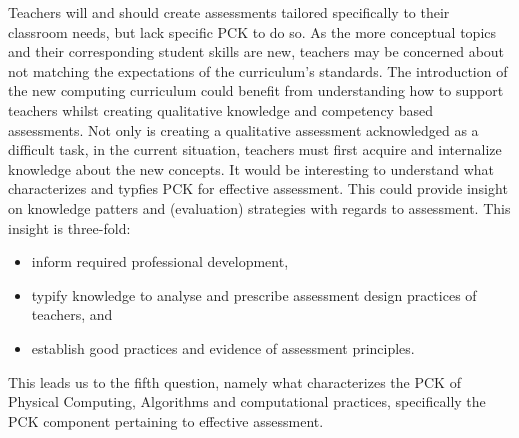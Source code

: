 
Teachers will and should create assessments tailored specifically to their classroom needs, but lack specific PCK to do so. As the more conceptual topics and their corresponding student skills are new, teachers may be concerned about not matching the expectations of the curriculum's standards. The introduction of the new computing curriculum could benefit from understanding how to support teachers whilst creating qualitative knowledge and competency based assessments. Not only is creating a qualitative assessment acknowledged as a difficult task, in the current situation, teachers must first acquire and internalize knowledge about the new concepts. It would be interesting to understand what characterizes and typfies PCK for effective assessment. This could provide insight on knowledge patters and (evaluation) strategies with regards to assessment. This insight is three-fold:
\begin{itemize}
\item inform required professional development,
\item typify knowledge to analyse and prescribe assessment design practices of teachers, and
\item establish good practices and evidence of assessment principles.
\end{itemize}

This leads us to the fifth question, namely what characterizes the PCK of Physical Computing, Algorithms and computational practices, specifically the PCK component pertaining to effective assessment.








